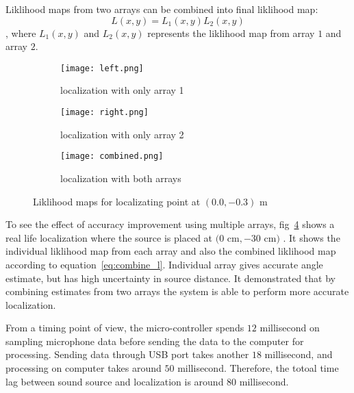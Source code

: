Liklihood maps from two arrays can be combined into final liklihood map:
\begin{equation}\label{eq:combine_l}
L(x,y) = L_1(x,y) L_2(x,y)
\end{equation}
, where $L_1(x,y)$ and $L_2(x,y)$ represents the liklihood map from array $1$ and array $2$.

\begin{figure}[]
  \centering
  \begin{subfigure}[]{.23\textwidth}
    \texttt{[image: left.png]}
    \caption{localization with only array 1}
    \label{fig:liklihood1}
  \end{subfigure}
  \begin{subfigure}[]{.23\textwidth}
    \texttt{[image: right.png]}
    \caption{localization with only array 2}
    \label{fig:liklihood2}
  \end{subfigure}
  \begin{subfigure}[]{.23\textwidth}
    \texttt{[image: combined.png]}
    \caption{localization with both arrays}
    \label{fig:liklihood3}
  \end{subfigure}
  \caption{Liklihood maps for localizating point at $(0.0,-0.3)$ m}
  \label{fig:liklihood}
\end{figure}


To see the effect of accuracy improvement using multiple arrays, fig~\ref{fig:liklihood} shows a real life localization where the source is placed at $(0$ cm$,-30$ cm$)$ . It shows the individual liklihood map from each array and also the combined liklihood map according to equation~\ref{eq:combine_l}. Individual array gives accurate angle estimate, but has high uncertainty in source distance. It demonstrated that by combining estimates from two arrays the system is able to perform more accurate localization. 

From a timing point of view, the micro-controller spends $12$ millisecond on sampling microphone data before sending the data to the computer for processing. Sending data through USB port takes another $18$ millisecond, and processing on computer takes around $50$ millisecond. Therefore, the totoal time lag between sound source and localization is around $80$ millisecond.
